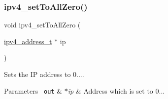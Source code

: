 \subsubsection{\texorpdfstring{ipv4\_setToAllZero()}{ipv4\_setToAllZero()}}
{\footnotesize\ttfamily void ipv4\+\_\+set\+To\+All\+Zero (\begin{DoxyParamCaption}\item[{\mbox{\hyperlink{group__ipv4_gad9df0882950e70d0587a4b423beb261a}{ipv4\+\_\+address\+\_\+t}} $\ast$}]{ip }\end{DoxyParamCaption})}



Sets the IP address to 0.... 


\begin{DoxyParams}[1]{Parameters}
\mbox{\texttt{ out}}  & {\em $\ast$ip} & Address which is set to 0... \\
\hline
\end{DoxyParams}
